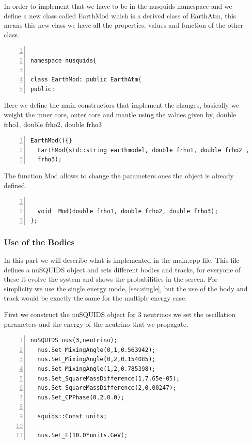In order to implement that we have to be in the {\ttf nusquids} namespace and we define a
new class called {\ttf EarthMod} which is a derived class of {\ttf
  EarthAtm}, this means this new class we have all the properties,
values and function of the other class. 
\begin{lstlisting}[frame=leftline, numbers = left,breaklines=true,label = ex:sin1]

namespace nusquids{

class EarthMod: public EarthAtm{
public:
\end{lstlisting}
Here we define the main constructors that implement the changes,
basically we weight the inner core, outer core and mantle using the
values given by, {\ttf double frho1}, {\ttf double frho2}, {\ttf
  double frho3}
\begin{lstlisting}[frame=leftline, numbers = left,breaklines=true,label = ex:sin1,firstnumber=last]
  EarthMod(){}
  EarthMod(std::string earthmodel, double frho1, double frho2 , double
  frho3);
\end{lstlisting}
The function {\ttf Mod} allows to change the parameters ones the
object is already defined.
\begin{lstlisting}[frame=leftline, numbers =
  left,breaklines=true,label = ex:sin1,firstnumber=last]

  void  Mod(double frho1, double frho2, double frho3);
};

\end{lstlisting}

\subsubsection{Use of the Bodies}

In this part we will describe what is implemented in the {\ttf
  main.cpp} file.
This file defines a nuSQUIDS object and sets different bodies and
tracks, for everyone of these it evolve the system and shows the
probabilities in the screen.
For simplicity we use the single energy mode, \ref{sec:single}, but the use of the body
and track would be exactly the same for the multiple energy case.

First we construct the nuSQUIDS object for 3 neutrinos we set the
oscillation parameters and the energy of the neutrino that we
propagate.

\begin{lstlisting}[frame=leftline, numbers =
  left,breaklines=true,label = ex:sin1]
  nuSQUIDS nus(3,neutrino);
  nus.Set_MixingAngle(0,1,0.563942);
  nus.Set_MixingAngle(0,2,0.154085);
  nus.Set_MixingAngle(1,2,0.785398);
  nus.Set_SquareMassDifference(1,7.65e-05);
  nus.Set_SquareMassDifference(2,0.00247);
  nus.Set_CPPhase(0,2,0.0);

  squids::Const units;

  nus.Set_E(10.0*units.GeV);
\end{lstlisting}

